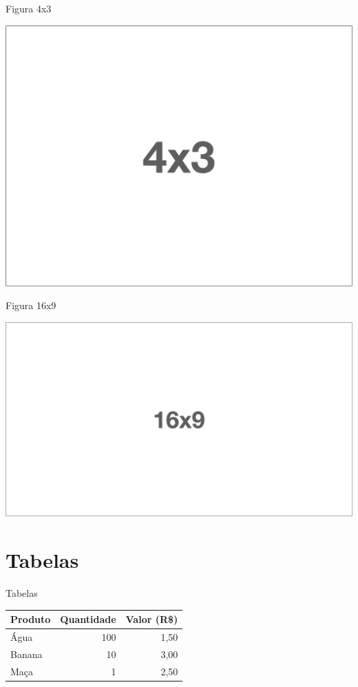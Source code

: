 \documentclass[aspectratio=169]{beamer}
\begin{document}
\begin{frame}{Figura 4x3}
    \begin{center}
        \includegraphics[height=.8\paperheight]{figs/4x3.png}
    \end{center}
\end{frame}
    

\begin{frame}{Figura 16x9}
\begin{center}
    \includegraphics[width=.95\linewidth]{figs/16x9.png}
\end{center}
\end{frame}

\section{Tabelas}

\begin{frame}{Tabelas}
\begin{center}
    \begin{tabular}{l r r}\\\toprule
        Produto & Quantidade & Valor (R\$) \\\midrule
        Água    &      100   &   1,50 \\ 
        Banana  &       10   &   3,00 \\
        Maça    &        1   &   2,50 \\ \bottomrule
    \end{tabular}
\end{center}
\end{frame}
\end{document}

